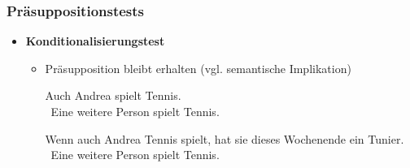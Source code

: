 \begin{frame}
\frametitle{Präsuppositionstests}

\begin{itemize}
\item \textbf{Konditionalisierungstest}

\vspace{5mm}

	\begin{itemize}
		\item Präsupposition bleibt erhalten (vgl. semantische Implikation)
		
		\ea Auch Andrea spielt Tennis.\\ \prspp\ Eine weitere Person spielt Tennis.
		\z
		
		\ea Wenn auch Andrea Tennis spielt, hat sie dieses Wochenende ein Tunier.\\ \prspp\ Eine weitere Person spielt Tennis.
		\z
		
%

	\end{itemize}
	
\end{itemize}

\end{frame}



%
%	
%	
%	
%		
%
%



